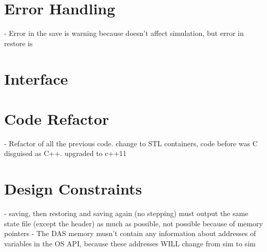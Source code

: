 {\section{Error Handling}
- Error in the save is warning because doesn't affect simulation, but error in restore is 

\section{\Cpp Interface}

\section{Code Refactor}
- Refactor of all the previous code. change to STL containers, code before was C disguised as C++. upgraded to c++11

\section{Design Constraints}
- saving, then restoring and saving again (no stepping) must output the same state file (except the header) as much as possible, not possible because of memory pointers
- The DAS memory musn't contain any information about addresses of variables in the OS API, because these addresses WILL change from sim to sim
}